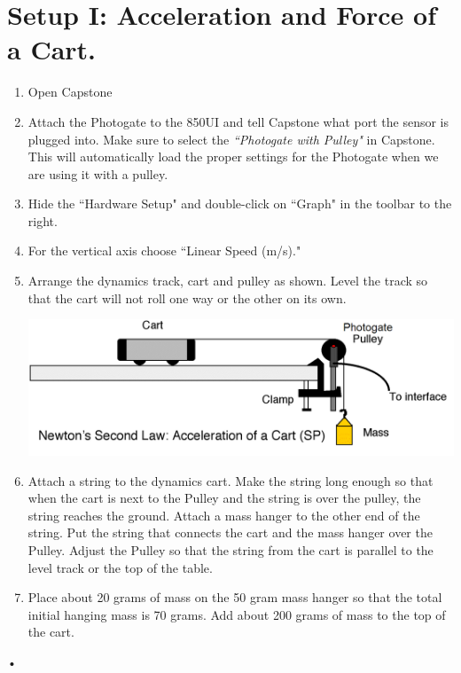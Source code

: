 \documentclass[main.tex]{subfiles}
\begin{document}
\section{Setup I: Acceleration and Force of a Cart.}
\begin{enumerate}
\item
Open Capstone
\item
Attach the Photogate to the 850UI and tell Capstone what port the sensor is plugged into. Make sure to select the \emph{``Photogate with Pulley"} in Capstone. This will automatically load the proper settings for the Photogate when we are using it with a pulley.
\item
Hide the ``Hardware Setup" and double-click on ``Graph" in the toolbar to the right.
\item
For the vertical axis choose ``Linear Speed (m/s)."
\item
Arrange the dynamics track, cart and pulley as shown. Level the track so that the cart will not roll one way or the other on its own.

\includegraphics[width=\textwidth]{Force_1_Setup}

\item
Attach a string to the dynamics cart. Make the string long enough so that when the cart is next to the Pulley and the string is over the pulley, the string reaches the ground. Attach a mass hanger to the other end of the string. Put the string that connects the cart and the mass hanger over the Pulley. Adjust the Pulley so that the string from the cart is parallel to the level track or the top of the table.
\item
Place about 20 grams of mass on the 50 gram mass hanger so that the total initial hanging mass is 70 grams. Add about 200 grams of mass to the top of the cart.
\end{enumerate}•
\end{document}
